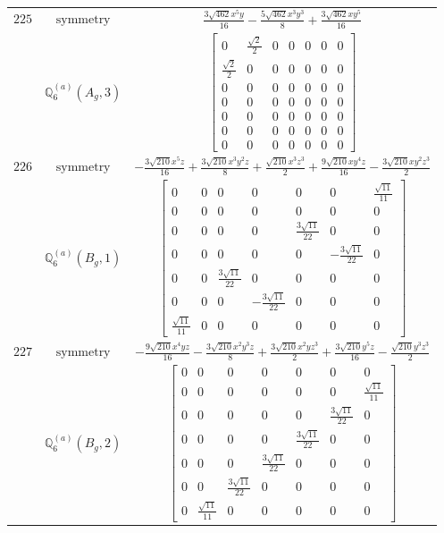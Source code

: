 \documentclass[fleqn,8pt,landscape]{jsarticle}
\begin{document}
\begin{longtable}{ccc}
$ 225 $ & $ \text{symmetry} $ & $ \frac{3 \sqrt{462} x^{5} y}{16} - \frac{5 \sqrt{462} x^{3} y^{3}}{8} + \frac{3 \sqrt{462} x y^{5}}{16} $ \\
$  $ & $ \mathbb{Q}_{6}^{(a)}(A_{g},3) $ & $ \begin{bmatrix} 0 & \frac{\sqrt{2}}{2} & 0 & 0 & 0 & 0 & 0 \\ \frac{\sqrt{2}}{2} & 0 & 0 & 0 & 0 & 0 & 0 \\ 0 & 0 & 0 & 0 & 0 & 0 & 0 \\ 0 & 0 & 0 & 0 & 0 & 0 & 0 \\ 0 & 0 & 0 & 0 & 0 & 0 & 0 \\ 0 & 0 & 0 & 0 & 0 & 0 & 0 \\ 0 & 0 & 0 & 0 & 0 & 0 & 0 \end{bmatrix} $ \\ \hline
$ 226 $ & $ \text{symmetry} $ & $ - \frac{3 \sqrt{210} x^{5} z}{16} + \frac{3 \sqrt{210} x^{3} y^{2} z}{8} + \frac{\sqrt{210} x^{3} z^{3}}{2} + \frac{9 \sqrt{210} x y^{4} z}{16} - \frac{3 \sqrt{210} x y^{2} z^{3}}{2} $ \\
$  $ & $ \mathbb{Q}_{6}^{(a)}(B_{g},1) $ & $ \begin{bmatrix} 0 & 0 & 0 & 0 & 0 & 0 & \frac{\sqrt{11}}{11} \\ 0 & 0 & 0 & 0 & 0 & 0 & 0 \\ 0 & 0 & 0 & 0 & \frac{3 \sqrt{11}}{22} & 0 & 0 \\ 0 & 0 & 0 & 0 & 0 & - \frac{3 \sqrt{11}}{22} & 0 \\ 0 & 0 & \frac{3 \sqrt{11}}{22} & 0 & 0 & 0 & 0 \\ 0 & 0 & 0 & - \frac{3 \sqrt{11}}{22} & 0 & 0 & 0 \\ \frac{\sqrt{11}}{11} & 0 & 0 & 0 & 0 & 0 & 0 \end{bmatrix} $ \\ \hline
$ 227 $ & $ \text{symmetry} $ & $ - \frac{9 \sqrt{210} x^{4} y z}{16} - \frac{3 \sqrt{210} x^{2} y^{3} z}{8} + \frac{3 \sqrt{210} x^{2} y z^{3}}{2} + \frac{3 \sqrt{210} y^{5} z}{16} - \frac{\sqrt{210} y^{3} z^{3}}{2} $ \\
$  $ & $ \mathbb{Q}_{6}^{(a)}(B_{g},2) $ & $ \begin{bmatrix} 0 & 0 & 0 & 0 & 0 & 0 & 0 \\ 0 & 0 & 0 & 0 & 0 & 0 & \frac{\sqrt{11}}{11} \\ 0 & 0 & 0 & 0 & 0 & \frac{3 \sqrt{11}}{22} & 0 \\ 0 & 0 & 0 & 0 & \frac{3 \sqrt{11}}{22} & 0 & 0 \\ 0 & 0 & 0 & \frac{3 \sqrt{11}}{22} & 0 & 0 & 0 \\ 0 & 0 & \frac{3 \sqrt{11}}{22} & 0 & 0 & 0 & 0 \\ 0 & \frac{\sqrt{11}}{11} & 0 & 0 & 0 & 0 & 0 \end{bmatrix} $ \\ \hline

\end{longtable}
\end{document}
